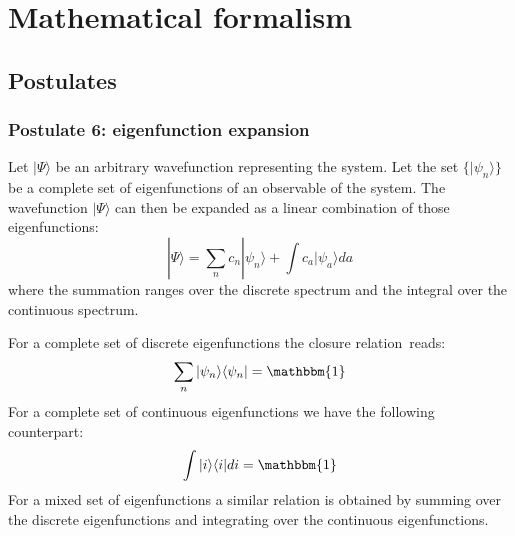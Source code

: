 \chapter{Mathematical formalism}

\section{Postulates}
\subsection{Postulate 6: eigenfunction expansion}

    
	\begin{formula}
    		Let $|\Psi\rangle$ be an arbitrary wavefunction representing the system. Let the set $\{|\psi_n\rangle\}$ be a complete set of eigenfunctions of an observable of the system. The wavefunction $|\Psi\rangle$ can then be expanded as a linear combination of those eigenfunctions:
		\begin{equation}
	        	\label{qm_formalism:eigenfunction_expansion}
			\boxed{|\Psi\rangle = \sum_nc_n|\psi_n\rangle + \int c_a|\psi_a\rangle da}
		\end{equation}
	        where the summation ranges over the discrete spectrum and the integral over the continuous spectrum.
	\end{formula}
   
	\begin{formula}
	    	For a complete set of discrete eigenfunctions the closure relation\footnotemark\ reads:
		\begin{equation}
		        \label{qm_formalism:closure}
			\sum_n|\psi_n\rangle\langle\psi_n| = \mathbbm{1}
		\end{equation}
	        For a complete set of continuous eigenfunctions we have the following counterpart:
	        \begin{equation}
		        \label{qm_formalism:closure_continuouos}
			\int|i\rangle\langle i|di = \mathbbm{1}
		\end{equation}
	        For a mixed set of eigenfunctions a similar relation is obtained by summing over the discrete eigenfunctions and integrating over the continuous eigenfunctions.
	\end{formula}

